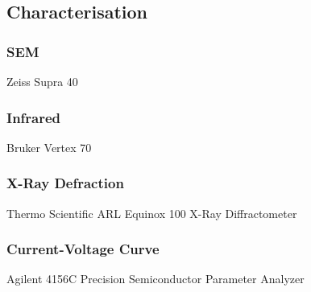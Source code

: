 \documentclass[a4paper]{article}
\begin{document}
\subsection{Characterisation}
\subsubsection{SEM}
Zeiss Supra 40
\subsubsection{Infrared}
Bruker Vertex 70
\subsubsection{X-Ray Defraction}
Thermo Scientific ARL Equinox 100 X-Ray Diffractometer
\subsubsection{Current-Voltage Curve}
Agilent 4156C Precision Semiconductor Parameter Analyzer
\end{document}
